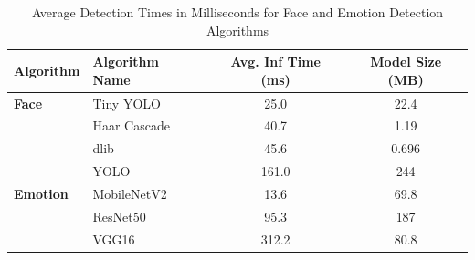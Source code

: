 \begin{table}[h!]
\centering
\caption{Average Detection Times in Milliseconds for Face and Emotion Detection Algorithms}
\begin{tabular}{|l|l|c|c|}
\hline
\textbf{Algorithm} & \textbf{Algorithm Name} & \textbf{Avg. Inf Time (ms)} & \textbf{Model Size (MB)}\\ \hline
\textbf{Face} & Tiny YOLO               & 25.0    &   22.4                                            \\ \cline{2-4} 
                        & Haar Cascade            & 40.7    &   1.19                    \\ \cline{2-4} 
                        & dlib                    & 45.6    &   0.696                   \\ \cline{2-4} 
                        & YOLO                    & 161.0   &   244                     \\ \hline
\textbf{Emotion} & MobileNetV2          & 13.6    &   69.8                                            \\ \cline{2-4} 
                        & ResNet50                & 95.3    &   187                      \\ \cline{2-4} 
                        & VGG16                   & 312.2   &   80.8                     \\ \hline
\end{tabular}
\label{tab:algorithm_detection_times_ms}
\end{table}


